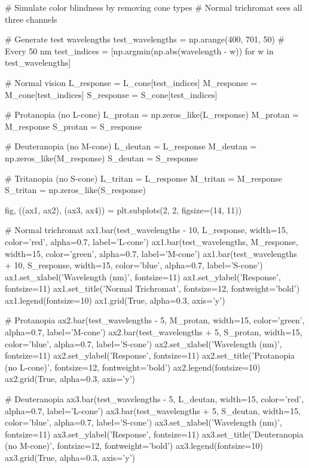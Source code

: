 \documentclass[11pt,a4paper]{article}
\begin{document}
\begin{pycode}
# Simulate color blindness by removing cone types
# Normal trichromat sees all three channels

# Generate test wavelengths
test_wavelengths = np.arange(400, 701, 50)  # Every 50 nm
test_indices = [np.argmin(np.abs(wavelength - w)) for w in test_wavelengths]

# Normal vision
L_response = L_cone[test_indices]
M_response = M_cone[test_indices]
S_response = S_cone[test_indices]

# Protanopia (no L-cone)
L_protan = np.zeros_like(L_response)
M_protan = M_response
S_protan = S_response

# Deuteranopia (no M-cone)
L_deutan = L_response
M_deutan = np.zeros_like(M_response)
S_deutan = S_response

# Tritanopia (no S-cone)
L_tritan = L_response
M_tritan = M_response
S_tritan = np.zeros_like(S_response)

fig, ((ax1, ax2), (ax3, ax4)) = plt.subplots(2, 2, figsize=(14, 11))

# Normal trichromat
ax1.bar(test_wavelengths - 10, L_response, width=15, color='red',
        alpha=0.7, label='L-cone')
ax1.bar(test_wavelengths, M_response, width=15, color='green',
        alpha=0.7, label='M-cone')
ax1.bar(test_wavelengths + 10, S_response, width=15, color='blue',
        alpha=0.7, label='S-cone')
ax1.set_xlabel('Wavelength (nm)', fontsize=11)
ax1.set_ylabel('Response', fontsize=11)
ax1.set_title('Normal Trichromat', fontsize=12, fontweight='bold')
ax1.legend(fontsize=10)
ax1.grid(True, alpha=0.3, axis='y')

# Protanopia
ax2.bar(test_wavelengths - 5, M_protan, width=15, color='green',
        alpha=0.7, label='M-cone')
ax2.bar(test_wavelengths + 5, S_protan, width=15, color='blue',
        alpha=0.7, label='S-cone')
ax2.set_xlabel('Wavelength (nm)', fontsize=11)
ax2.set_ylabel('Response', fontsize=11)
ax2.set_title('Protanopia (no L-cone)', fontsize=12, fontweight='bold')
ax2.legend(fontsize=10)
ax2.grid(True, alpha=0.3, axis='y')

# Deuteranopia
ax3.bar(test_wavelengths - 5, L_deutan, width=15, color='red',
        alpha=0.7, label='L-cone')
ax3.bar(test_wavelengths + 5, S_deutan, width=15, color='blue',
        alpha=0.7, label='S-cone')
ax3.set_xlabel('Wavelength (nm)', fontsize=11)
ax3.set_ylabel('Response', fontsize=11)
ax3.set_title('Deuteranopia (no M-cone)', fontsize=12, fontweight='bold')
ax3.legend(fontsize=10)
ax3.grid(True, alpha=0.3, axis='y')


\end{pycode}
\end{document}
